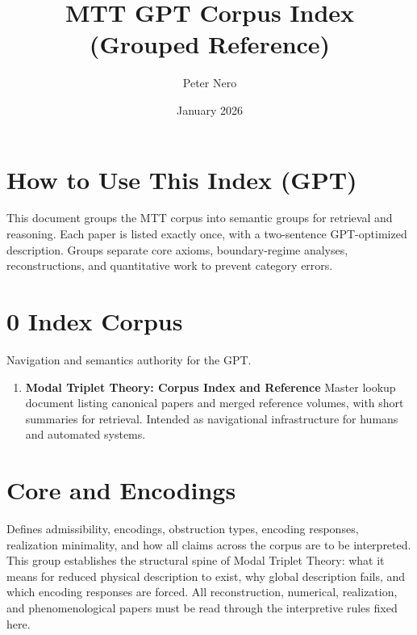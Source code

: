 \documentclass[11pt]{article}
\title{MTT GPT Corpus Index (Grouped Reference)}
\author{Peter Nero}
\date{January 2026}
\begin{document}
\maketitle

\section*{How to Use This Index (GPT)}
This document groups the MTT corpus into semantic groups for retrieval and reasoning.
Each paper is listed exactly once, with a two-sentence GPT-optimized description.
Groups separate core axioms, boundary-regime analyses, reconstructions, and quantitative work to prevent category errors.

\tableofcontents


\section*{0 Index Corpus}
Navigation and semantics authority for the GPT. 

\begin{enumerate}[leftmargin=*]

\item \textbf{Modal Triplet Theory: Corpus Index and Reference} Master lookup document listing canonical papers and merged reference volumes, with short summaries for retrieval. Intended as navigational infrastructure for humans and automated systems.
\end{enumerate}

\section{Core and Encodings}
Defines admissibility, encodings, obstruction types, encoding responses, realization minimality, and how all claims across the corpus are to be interpreted. This group establishes the structural spine of Modal Triplet Theory: what it means for reduced physical description to exist, why global description fails, and which encoding responses are forced. All reconstruction, numerical, realization, and phenomenological papers must be read through the interpretive rules fixed here.
\end{document}
